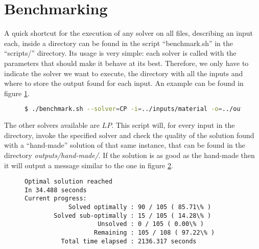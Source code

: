 \section{Benchmarking}
\label{sec:benchmarking}

A quick shortcut for the execution of any solver on all files, describing
an input each, inside a directory can be found in the script ``benchmark.sh''
in the ``scripts/'' directory. Its usage is very simple: each solver is
called with the parameters that should make it behave at its best. Therefore,
we only have to indicate the solver we want to execute, the directory with
all the inputs and where to store the output found for each input. An example
can be found in figure \ref{fig:benchmark-example}.

\begin{figure}[H]
\centering
\begin{lstlisting}[language=bash,basicstyle=\centering]
$ ./benchmark.sh --solver=CP -i=../inputs/material -o=../outputs/CP
\end{lstlisting}
\label{fig:benchmark-example}
\end{figure}

The other solvers available are $LP$. This script will, for every input in the
directory, invoke the specified solver and check the quality of the solution
found with a ``hand-made'' solution of that same instance, that can be found in
the directory \textit{outputs/hand-made/}. If the solution is as good as the
hand-made then it will output a message similar to the one in figure
\ref{fig:benchmark-verbose:optimal}.

\begin{figure}[H]
\centering
{\scriptsize
\begin{BVerbatim}
Optimal solution reached
In 34.488 seconds
Current progress:
            Solved optimally : 90 / 105 ( 85.71\% )
        Solved sub-optimally : 15 / 105 ( 14.28\% )
                    Unsolved : 0 / 105 ( 0.00\% )
                   Remaining : 105 / 108 ( 97.22\% )
          Total time elapsed : 2136.317 seconds
\end{BVerbatim}
}
\label{fig:benchmark-verbose:optimal}
\end{figure}

